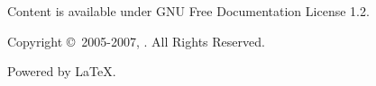 
\begin{flushleft}
Content is available under GNU Free Documentation License 1.2.


Copyright \copyright\ 2005-2007, \lextm. All Rights Reserved.
\end{flushleft}
\begin{center}
Powered by \LaTeX.
\end{center}